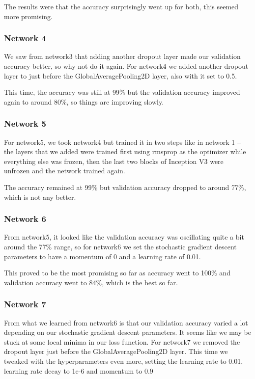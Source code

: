 The results were that the accuracy surprisingly went up for both, this seemed more promising.
\subsubsection{Network 4}

We saw from network3 that adding another dropout layer made our validation accuracy better, so why not do it again. For network4 we added another dropout layer to just before the GlobalAveragePooling2D layer, also with it set to 0.5. 


This time, the accuracy was still at 99\% but the validation accuracy improved again to around 80\%, so things are improving slowly.
\subsubsection{Network 5}

For network5, we took network4 but trained it in two steps like in network 1 – the layers that we added were trained first using rmsprop as the optimizer while everything else was frozen, then the last two blocks of Inception V3 were unfrozen and the network trained again. 


The accuracy remained at 99\% but validation accuracy dropped to around 77\%, which is not any better.
\subsubsection{Network 6}

From network5, it looked like the validation accuracy was oscillating quite a bit around the 77\% range, so for network6 we set the stochastic gradient descent parameters to have a momentum of 0 and a learning rate of 0.01.


This proved to be the most promising so far as accuracy went to 100\% and validation accuracy went to 84\%, which is the best so far.
\subsubsection{Network 7}

From what we learned from network6 is that our validation accuracy varied a lot depending on our stochastic gradient descent parameters. It seems like we may be stuck at some local minima in our loss function. For network7 we removed the dropout layer just before the GlobalAveragePooling2D layer. This time we tweaked with the hyperparameters even more, setting the learning rate to 0.01, learning rate decay to 1e-6 and momentum to 0.9

